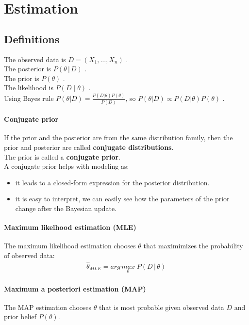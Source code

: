 \documentclass[../main.tex]{subfiles}
\begin{document}
\chapter{Estimation}
\section{Definitions}
The observed data is $D = (X_1, \dots, X_n)$ . \\
The posterior is $P(\theta\, | \, D)$ . \\
The prior is $P(\theta)$ . \\
The likelihood is $P(D\; |\; \theta)$ . \\
Using Bayes rule $P(\theta | D) = \frac{P(D|\theta)P(\theta)}{P(D)}$,
so $P(\theta | D) \propto P(D|\theta)P(\theta)$ .

\subsubsection{Conjugate prior}
If the prior and the posterior are from the same distribution family,
then the prior and posterior are called \textbf{conjugate distributions}. \\
The prior is called a \textbf{conjugate prior}. \\
A conjugate prior helps with modeling as:
\begin{itemize}
    \item it leads to a closed-form expression for the posterior distribution.
    \item it is easy to interpret, we can easily see how the parameters of the prior change after the Bayesian update.
\end{itemize}

\subsubsection{Maximum likelhood estimation (MLE)}
The maximum likelihood estimation chooses $\theta$ that maximimizes the probability of observed data:
\begin{align*}
    \hat{\theta}_{MLE} = arg\,\underset{\theta}{max}\; P(D\,|\, \theta)
\end{align*}

\subsubsection{Maximum a posteriori estimation (MAP)}
The MAP estimation chooses $\theta$ that is most probable given observed data $D$ and prior belief
$P(\theta)$.
\end{document}
